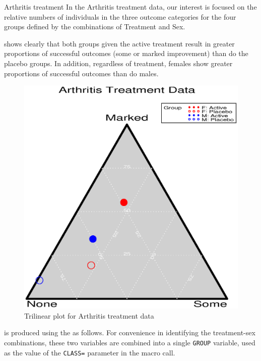 \begin{Example}[arthrit5]{Arthritis treatment}
In the Arthritis treatment data, our interest is focused on the
relative numbers of individuals in the three outcome categories
for the four groups defined by the combinations of Treatment
and Sex.

 shows clearly that both groups given the
active treatment result in greater proportions of successful
outcomes (some or marked improvement) than do the placebo
groups.
In addition, regardless of treatment, females show greater
proportions of successful outcomes than do males.

\begin{figure}[htb]
  \centering
  \includegraphics[scale=.6]{ch3/fig/arthtri}
  \caption[Trilinear plot for Arthritis treatment data]{Trilinear plot for Arthritis treatment data}\label{fig:arthtri}
\end{figure}

 is produced using the 
as follows.  For convenience in identifying the treatment-sex combinations,
these two variables are combined into a single \texttt{GROUP} variable,
used as the value of the \texttt{CLASS=} parameter in the macro call.

\end{Example}

